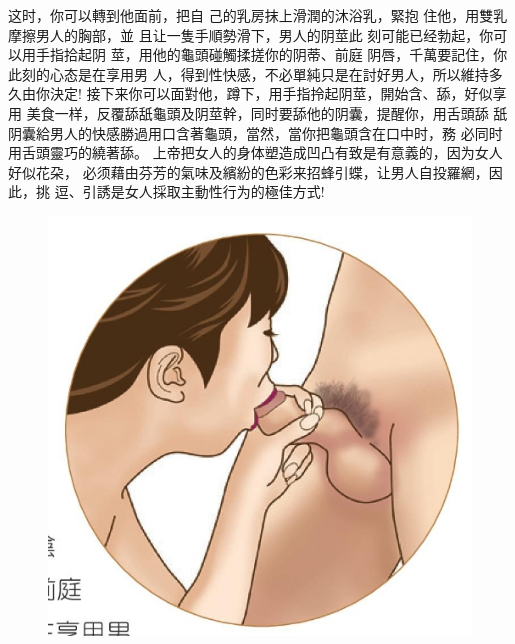 \documentclass[12pt,UTF8]{ctexbook}
\begin{document}
这时，你可以轉到他面前，把自
己的乳房抹上滑潤的沐浴乳，緊抱
住他，用雙乳摩擦男人的胸部，並
且让一隻手順勢滑下，男人的阴莖此
刻可能已经勃起，你可以用手指拾起阴
莖，用他的龜頭碰觸揉搓你的阴蒂、前庭
阴唇，千萬要記住，你此刻的心态是在享用男
人，得到性快感，不必單純只是在討好男人，所以維持多久由你決定!
接下来你可以面對他，蹲下，用手指拎起阴莖，開始含、舔，好似享用
美食一样，反覆舔舐龜頭及阴莖幹，同时要舔他的阴囊，提醒你，用舌頭舔
舐阴囊給男人的快感勝過用口含著龜頭，當然，當你把龜頭含在口中时，務
必同时用舌頭靈巧的繞著舔。
上帝把女人的身体塑造成凹凸有致是有意義的，因为女人好似花朶，
必须藉由芬芳的氣味及繽紛的色彩来招蜂引蝶，让男人自投羅網，因此，挑
逗、引誘是女人採取主動性行为的極佳方式!

\begin{figure}[htbp]
	\centering
	\includegraphics[width=0.7\linewidth]{15}
	\caption{}
	\label{fig:1}
\end{figure}
\end{document}
